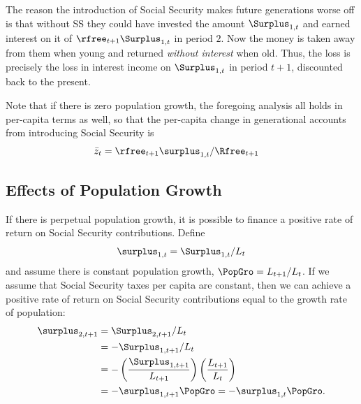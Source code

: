 \documentclass{handout}
\begin{document}
The reason the introduction of Social Security makes future 
generations worse off is that without SS they could have invested the 
amount $\Surplus_{1,t}$ and earned interest on it of $\rfree_{t+1}\Surplus_{1,t}$ in 
period $2$.  Now the money is taken away from them when young and 
returned {\it without interest} when old.  Thus, the loss is precisely 
the loss in interest income on $\Surplus_{1,t}$ in period $t+1$, discounted 
back to the present.

Note that if there is zero population growth, the foregoing analysis
all holds in per-capita terms as well, so that the per-capita
change in generational accounts from introducing Social Security 
is
\begin{equation}\begin{gathered}\begin{aligned}
        \bar{z}_{t} & =  \rfree_{t+1}\surplus_{1,t}/\Rfree_{t+1}
\end{aligned}\end{gathered}\end{equation}

\subsection{Effects of Population Growth}

If there is perpetual population growth, it is possible to finance a 
positive rate of return on Social Security contributions.  Define
\begin{equation}
        \surplus_{1,t} = \Surplus_{1,t}/L_{t}
        \label{eq:zdef}
\end{equation}
and assume there is constant population growth, $\PopGro=L_{t+1}/L_{t}$.  
If we assume that Social Security taxes per capita are constant, 
then we can achieve a positive rate of return on Social Security 
contributions equal to the growth rate of population:
\begin{equation}\begin{gathered}\begin{aligned}
        \surplus_{2,t+1} & =  \Surplus_{2,t+1}/L_{t}  \\
                  & =  -\Surplus_{1,t+1}/L_{t}  \\
         & =  -\left(\frac{\Surplus_{1,t+1}}{L_{t+1}}\right)\left(\frac{L_{t+1}}{L_{t}}\right) 
\\       & =  -\surplus_{1,t+1}\PopGro = -\surplus_{1,t}\PopGro.
\end{aligned}\end{gathered}\end{equation}
\end{document}

